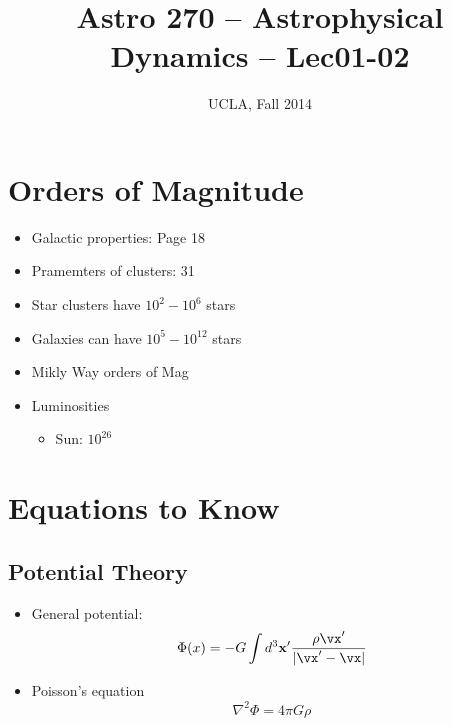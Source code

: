 


\title{Astro 270 -- Astrophysical Dynamics -- Lec01-02}
\author{UCLA, Fall 2014}


\setlength{\unitlength}{1mm}
\maketitle


\tableofcontents



\section{Orders of Magnitude}
\begin{itemize}
\item Galactic properties: Page 18
\item Pramemters of clusters: 31
\end{itemize}
\begin{itemize}
\item Star clusters have $10^2 - 10^6$ stars
\item Galaxies can have $10^5 - 10^{12}$ stars
\item Mikly Way orders of Mag
\item Luminosities
\begin{itemize}
\item Sun: $10^{26}$
\end{itemize}
\end{itemize}


\section{Equations to Know}
\subsection{Potential Theory}

\begin{itemize}
\item General potential:
\begin{equation}
\Phi(x) = -G\int d^3\v{x'} \frac{\rho{\vx'}}{|\vx' - \vx|}
\end{equation}
\item Poisson's equation
\begin{equation}
\nabla^2 \Phi = 4\pi G \rho
\end{equation}
\end{itemize}



